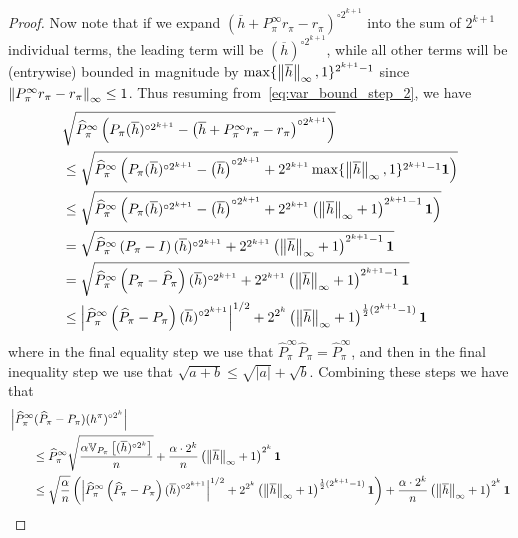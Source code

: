 \documentclass{article}
\theoremstyle{plain}
\theoremstyle{plain}
\theoremstyle{remark}
\theoremstyle{plain}
\theoremstyle{plain}
\newcommand{\Var}{\mathbb{V}}
\newcommand{\Phat}{\widehat{P}}
\newcommand{\one}{\mathbf{1}}
\newcommand{\hc}{\overline{h}}
\begin{document}
\begin{proof}
    Now note that if we expand $\left( \hc + P_\pi^\infty r_\pi - r_\pi \right)^{\circ 2^{k+1}}$ into the sum of $2^{k+1}$ individual terms, the leading term will be $(\hc)^{\circ 2^{k+1}}$, while all other terms will be (entrywise) bounded in magnitude by $\max \{\infnorm{\hc} , 1 \}^{2^{k+1}-1} $ since $\left\Vert P_\pi^\infty r_\pi - r_\pi\right\Vert _{\infty} \leq 1$.
    Thus resuming from~\eqref{eq:var_bound_step_2}, we have
    \begin{align*}
        &\sqrt{\Phat_\pi^\infty \left( P_\pi (\hc)^{\circ 2^{k+1}} - \left( \hc + P_\pi^\infty r_\pi - r_\pi \right)^{\circ 2^{k+1}}  \right) } \\
         &\leq  \sqrt{\Phat_\pi^\infty \left( P_\pi (\hc)^{\circ 2^{k+1}} - \left( \hc\right)^{\circ 2^{k+1}} + 2^{2^{k+1}} \max\{\infnorm{\hc}, 1 \}^{2^{k+1}-1} \one  \right) } \\
         &\leq  \sqrt{\Phat_\pi^\infty \left( P_\pi (\hc)^{\circ 2^{k+1}} - \left( \hc\right)^{\circ 2^{k+1}} + 2^{2^{k+1}} \left(\infnorm{\hc} + 1 \right)^{2^{k+1}-1} \one  \right) } \\
         & = \sqrt{\Phat^\infty_\pi \left(P_\pi - I \right) (\hc)^{\circ 2^{k+1}} + 2^{2^{k+1}} \left(\infnorm{\hc} + 1 \right)^{2^{k+1}-1} \one} \\
         & = \sqrt{\Phat^\infty_\pi \left(P_\pi - \Phat_\pi \right) (\hc)^{\circ 2^{k+1}} + 2^{2^{k+1}} \left(\infnorm{\hc} + 1 \right)^{2^{k+1}-1} \one} \\
         & \leq \left| \Phat_\pi^\infty \left(\Phat_\pi - P_\pi \right) (\hc)^{\circ 2^{k+1} } \right|^{1/2} + 2^{2^k} \left(\infnorm{\hc} + 1 \right)^{\frac{1}{2}(2^{k+1}-1)} \one
    \end{align*}
where in the final equality step we use that $\Phat_\pi^\infty \Phat_\pi = \Phat_\pi^\infty$, and then in the final inequality step we use that $\sqrt{a + b} \leq \sqrt{|a|} + \sqrt{b}$.
Combining these steps we have that
\begin{align*}
    & \left|\Phat_\pi^\infty (\Phat_\pi - P_\pi) (h^{\pi})^{\circ 2^k} \right| \\
    & \quad \quad \leq \Phat_\pi^\infty  \sqrt{\frac{\alpha \Var_{P_\pi}\left[(\hc)^{\circ 2^k} \right] }{n}} + \frac{\alpha \cdot 2^k  }{n}\left(\infnorm{\hc} + 1 \right)^{2^k} \one \\
    & \quad \quad \leq \sqrt{\frac{\alpha}{n}} \left( \left| \Phat_\pi^\infty \left(\Phat_\pi - P_\pi \right) (\hc)^{\circ 2^{k+1} } \right|^{1/2} + 2^{2^k} \left(\infnorm{\hc} + 1 \right)^{\frac{1}{2}(2^{k+1}-1)} \one \right) +\frac{\alpha \cdot 2^k  }{n}\left(\infnorm{\hc} + 1 \right)^{2^k} \one \\

\end{align*}
\end{proof}
\end{document}
